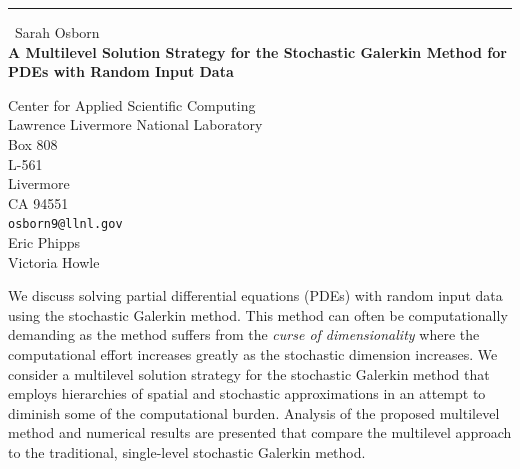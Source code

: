 \documentclass{report}
\begin{document}
\begin{center}
\rule{6in}{1pt} \
{\large Sarah Osborn \\
{\bf A Multilevel Solution Strategy for the Stochastic Galerkin Method for PDEs with Random Input Data}}

Center for Applied Scientific Computing \\ Lawrence Livermore National Laboratory \\ Box 808 \\ L-561 \\ Livermore \\ CA 94551
\\
{\tt osborn9@llnl.gov}\\
Eric Phipps\\
Victoria Howle\end{center}

We discuss solving partial differential equations (PDEs) with random
input data using the stochastic Galerkin method. This method can often be
computationally demanding as the method suffers from the \textit{curse of
dimensionality} where the computational effort increases greatly as the
stochastic dimension increases. We consider a multilevel solution
strategy for the stochastic Galerkin method that employs hierarchies of
spatial and stochastic approximations in an attempt to diminish some of
the computational burden. Analysis of the proposed multilevel method and
numerical results are presented that compare the multilevel approach to
the traditional, single-level stochastic Galerkin method.
\end{document}
